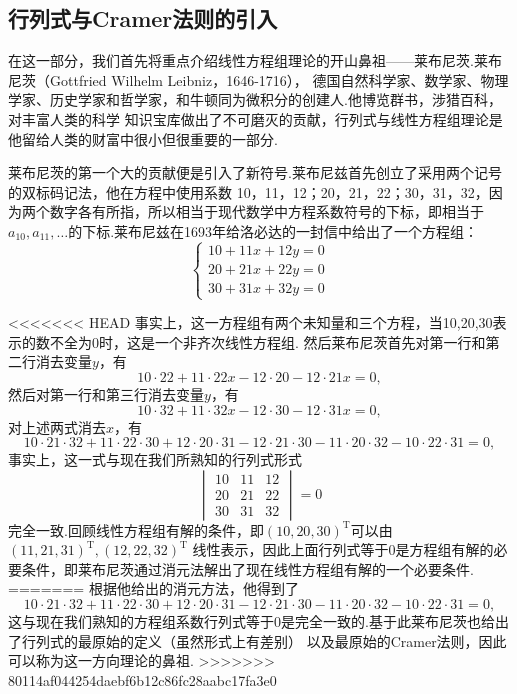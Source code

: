 \subsection{行列式与Cramer法则的引入}
在这一部分，我们首先将重点介绍线性方程组理论的开山鼻祖——莱布尼茨.莱布尼茨（Gottfried Wilhelm Leibniz，1646-1716），
德国自然科学家、数学家、物理学家、历史学家和哲学家，和牛顿同为微积分的创建人.他博览群书，涉猎百科，对丰富人类的科学
知识宝库做出了不可磨灭的贡献，行列式与线性方程组理论是他留给人类的财富中很小但很重要的一部分.

莱布尼茨的第一个大的贡献便是引入了新符号.莱布尼兹首先创立了采用两个记号的双标码记法，他在方程中使用系数
10，11，12；20，21，22；30，31，32，因为两个数字各有所指，所以相当于现代数学中方程系数符号的下标，即相当于
$a_{10},a_{11},\ldots$的下标.莱布尼兹在1693年给洛必达的一封信中给出了一个方程组：
\[\begin{cases}
    10+11x+12y=0\\
    20+21x+22y=0\\
    30+31x+32y=0
\end{cases}\]

<<<<<<< HEAD
事实上，这一方程组有两个未知量和三个方程，当10,20,30表示的数不全为0时，这是一个非齐次线性方程组.
然后莱布尼茨首先对第一行和第二行消去变量$y$，有
\[10\cdot 22+11\cdot 22x-12\cdot 20-12\cdot 21x=0,\]
然后对第一行和第三行消去变量$y$，有
\[10\cdot 32+11\cdot 32x-12\cdot 30-12\cdot 31x=0,\]
对上述两式消去$x$，有
\[10\cdot 21\cdot 32+11\cdot 22\cdot 30+12\cdot 20\cdot 31-12\cdot 21\cdot 30-11\cdot 20\cdot 32-10\cdot 22\cdot 31=0,\]
事实上，这一式与现在我们所熟知的行列式形式
\[\begin{vmatrix}
    10&11&12\\
    20&21&22\\
    30&31&32
\end{vmatrix}=0\]
完全一致.回顾线性方程组有解的条件，即$(10,20,30)^\mathrm{T}$可以由$(11,21,31)^\mathrm{T},(12,22,32)^\mathrm{T}$
线性表示，因此上面行列式等于0是方程组有解的必要条件，即莱布尼茨通过消元法解出了现在线性方程组有解的一个必要条件.
=======
根据他给出的消元方法，他得到了\[10\cdot 21\cdot 32+11\cdot 22\cdot 30+12\cdot 20\cdot 31-12\cdot 21\cdot 30-11\cdot 20\cdot 32-10\cdot 22\cdot 31=0,\]
这与现在我们熟知的方程组系数行列式等于0是完全一致的.基于此莱布尼茨也给出了行列式的最原始的定义（虽然形式上有差别）
以及最原始的Cramer法则，因此可以称为这一方向理论的鼻祖.
>>>>>>> 80114af044254daebf6b12c86fc28aabc17fa3e0

